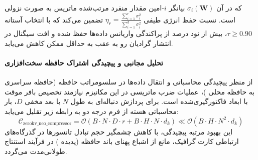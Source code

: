 که در آن $\sigma_i(\mathbf{W})$ بیانگر $i$-امین مقدار منفرد مرتب‌شده ماتریس به صورت نزولی است. نسبت حفظ انرژی طیفی $\eta_r = \frac{\sum_{i=1}^r \sigma_i^2}{\sum_{i=1}^{d} \sigma_i^2}$ تضمین می‌کند که با انتخاب آستانه $\tau \ge 0.90$، بیش از نود درصد از پراکندگی واریانس داده‌ها حفظ شده و افت سیگنال در انتشار گرادیان رو به عقب به حداقل ممکن کاهش می‌یابد.

\paragraph{تحلیل مجانبی و پیچیدگی اشتراک حافظه سخت‌افزاری}
از منظر پیچیدگی محاسباتی و انتقال داده‌ها در سلسومراتب حافظه (حافظه سراسری  به حافظه محلی )، عملیات ضرب ماتریسی در این مکانیزم نیازمند تخصیص بافر موقت با ابعاد فاکتورگیری‌شده است. برای پردازش دنباله‌ای به طول $N$ با بعد مخفی $D$، بار محاسباتی هسته از فرم درجه دو به رابطه زیر تقلیل می‌یابد:
\begin{equation}
\label{eq:complexity_zerokv_neo_compressor}
\mathcal{C}_{\text{zerokv\_neo\_compressor}} = \mathcal{O}\left( B \cdot N \cdot D \cdot r + B \cdot H \cdot N \cdot d_k \right) \ll \mathcal{O}\left( B \cdot H \cdot N^2 \cdot d_k \right)
\end{equation}
این بهبود مرتبه پیچیدگی، با کاهش چشمگیر حجم تبادل تانسورها در گذرگاه‌های ارتباطی کارت گرافیک، مانع از اشباع پهنای باند حافظه (پدیده ) در فرآیند استنتاج طولانی‌مدت می‌گردد.
